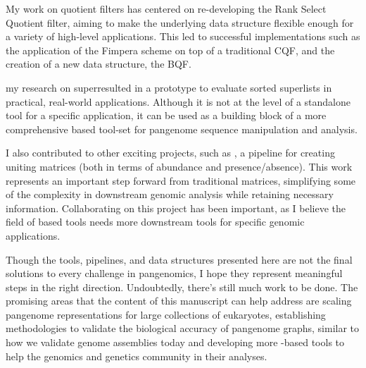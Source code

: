 My work on quotient filters has centered on re-developing the Rank Select Quotient filter, aiming to make the underlying data structure flexible enough for a variety of high-level applications. This led to successful implementations such as the application of the Fimpera scheme on top of a traditional CQF, and the creation of a new data structure, the BQF.

my research on super\kmers resulted in a prototype to evaluate sorted super\kmer lists in practical, real-world applications. Although it is not at the level of a standalone tool for a specific application, it can be used as a building block of a more comprehensive \kmer based tool-set for pangenome sequence manipulation and analysis.

I also contributed to other exciting projects, such as \muset, a pipeline for creating uniting matrices (both in terms of abundance and presence/absence). This work represents an important step forward from traditional \kmer matrices, simplifying some of the complexity in downstream genomic analysis while retaining necessary information. Collaborating on this project has been important, as I believe the field of \kmer based tools needs more downstream tools for specific genomic applications.

Though the tools, pipelines, and data structures presented here are not the final solutions to every challenge in pangenomics, I hope they represent meaningful steps in the right direction. Undoubtedly, there’s still much work to be done. The promising areas that the content of this manuscript can help address are scaling pangenome representations for large collections of eukaryotes, establishing methodologies to validate the biological accuracy of pangenome graphs, similar to how we validate genome assemblies today and developing more \kmer-based tools to help the genomics and genetics community in their analyses.

